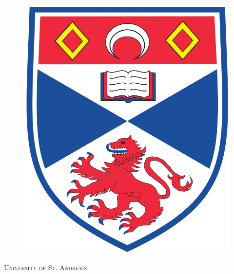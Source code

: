 \usepackage{mathtools}
\usepackage{hyperref}
\hypersetup{
    colorlinks=true,
    citecolor=black,
    filecolor=black,
    linkcolor=black,
    urlcolor=black
}
\graphicspath{ {images/} }

\renewcommand{\baselinestretch}{1.1}




\begin{titlepage}

\newcommand{\HRule}{\rule{\linewidth}{0.5mm}} %

\center %
 
\begin{figure}
    \centering
\includegraphics[scale=0.1]{ulogo.png}\\
\end{figure}
\textsc{\LARGE University of St. Andrews}\\[1cm] %


\end{titlepage}

